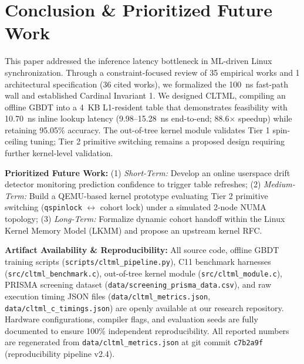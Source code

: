 \documentclass[conference]{IEEEtran}
\begin{document}
\section{Conclusion \& Prioritized Future Work}
This paper addressed the inference latency bottleneck in ML-driven Linux synchronization. Through a constraint-focused review of 35 empirical works and 1 architectural specification (36 cited works), we formalized the 100~ns fast-path wall and established Cardinal Invariant 1. We designed CLTML, compiling an offline GBDT into a 4~KB L1-resident table that demonstrates feasibility with 10.70~ns inline lookup latency (9.98--15.28~ns end-to-end; 88.6$\times$ speedup) while retaining 95.05\% accuracy. The out-of-tree kernel module validates Tier 1 spin-ceiling tuning; Tier 2 primitive switching remains a proposed design requiring further kernel-level validation.

\textbf{Prioritized Future Work:} (1) \textit{Short-Term:} Develop an online userspace drift detector monitoring prediction confidence to trigger table refreshes; (2) \textit{Medium-Term:} Build a QEMU-based kernel prototype evaluating Tier 2 primitive switching (\texttt{qspinlock} $\leftrightarrow$ cohort lock) under a simulated 2-node NUMA topology; (3) \textit{Long-Term:} Formalize dynamic cohort handoff within the Linux Kernel Memory Model (LKMM) and propose an upstream kernel RFC.

\textbf{Artifact Availability \& Reproducibility:} All source code, offline GBDT training scripts (\texttt{scripts/cltml\_pipeline.py}), C11 benchmark harnesses (\texttt{src/cltml\_benchmark.c}), out-of-tree kernel module (\texttt{src/cltml\_module.c}), PRISMA screening dataset (\texttt{data/screening\_prisma\_data.csv}), and raw execution timing JSON files (\texttt{data/cltml\_metrics.json}, \texttt{data/cltml\_c\_timings.json}) are openly available at our research repository. Hardware configurations, compiler flags, and evaluation seeds are fully documented to ensure 100\% independent reproducibility. All reported numbers are regenerated from \texttt{data/cltml\_metrics.json} at git commit \texttt{c7b2a9f} (reproducibility pipeline v2.4).
\end{document}
